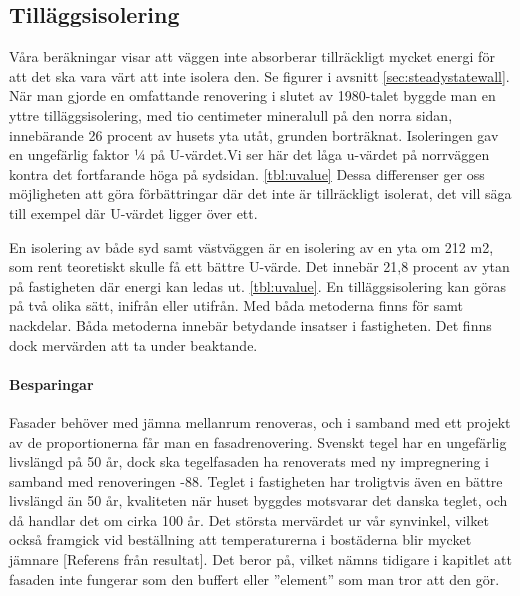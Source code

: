 \endequation

\subsection{Tilläggsisolering}
Våra beräkningar visar att väggen inte absorberar tillräckligt mycket energi för att det ska vara värt att inte isolera den. Se figurer i avsnitt \ref{sec:steadystatewall}.
När man gjorde en omfattande renovering i slutet av 1980-talet byggde man en yttre tilläggsisolering, med tio centimeter mineralull på den norra sidan, \cite{arsredovisning} innebärande 26 procent av husets yta utåt, grunden borträknat. Isoleringen gav en ungefärlig faktor ¼ på U-värdet.Vi ser här det låga u-värdet på norrväggen kontra det fortfarande höga på sydsidan. \ref{tbl:uvalue} Dessa differenser ger oss möjligheten att göra förbättringar där det inte är tillräckligt isolerat, det vill säga till exempel där U-värdet ligger över ett.

En isolering av både syd samt västväggen är en isolering av en yta om 212 m2, som rent teoretiskt skulle få ett bättre U-värde. Det innebär 21,8 procent av ytan på fastigheten där energi kan ledas ut. \ref{tbl:uvalue}.
En tilläggsisolering kan göras på två olika sätt, inifrån eller utifrån. Med båda metoderna finns för samt nackdelar. Båda metoderna innebär betydande insatser i fastigheten. Det finns dock mervärden att ta under beaktande. 

\paragraph{Besparingar}
Fasader behöver med jämna mellanrum renoveras, och i samband med ett projekt av de proportionerna får man en fasadrenovering. Svenskt tegel har en ungefärlig livslängd på 50 år\cite{magnus}, dock ska tegelfasaden ha renoverats med ny impregnering i samband med renoveringen -88. Teglet i fastigheten har troligtvis även en bättre livslängd än 50 år, kvaliteten när huset byggdes motsvarar det danska teglet, och då handlar det om cirka 100 år. Det största mervärdet ur vår synvinkel, vilket också framgick vid beställning att temperaturerna i bostäderna blir mycket jämnare [Referens från resultat]. Det beror på, vilket nämns tidigare i kapitlet att fasaden inte fungerar som den buffert eller ”element” som man tror att den gör.

